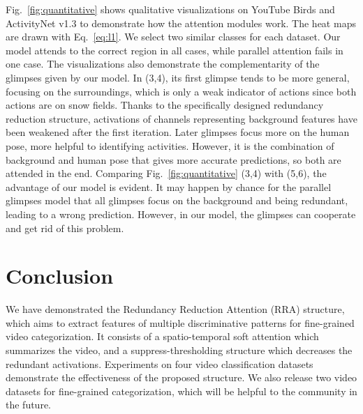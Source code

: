 \documentclass[runningheads]{llncs}
\begin{document}
Fig.~\ref{fig:quantitative} shows qualitative visualizations on YouTube Birds and ActivityNet v1.3 to demonstrate how the attention modules work. The heat maps are drawn with Eq.~\ref{eq:l1}. We select two similar classes for each dataset. Our model attends to the correct region in all cases, while parallel attention fails in one case. The visualizations also demonstrate the complementarity of the glimpses given by our model. In (3,4), its first glimpse tends to be more general, focusing on the surroundings, which is only a weak indicator of actions since both actions are on snow fields. Thanks to the specifically designed redundancy reduction structure, activations of channels representing background features have been weakened after the first iteration. Later glimpses focus more on the human pose, more helpful to identifying activities. However, it is the combination of background and human pose that gives more accurate predictions, so both are attended in the end. Comparing Fig.~\ref{fig:quantitative} (3,4) with (5,6), the advantage of our model is evident. It may happen by chance for the parallel glimpses model that all glimpses focus on the background and being redundant, leading to a wrong prediction. However, in our model, the glimpses can cooperate and get rid of this problem.

\section{Conclusion}
We have demonstrated the Redundancy Reduction Attention (RRA) structure, which aims to extract features of multiple discriminative patterns for fine-grained video categorization. It consists of a spatio-temporal soft attention which summarizes the video, and a suppress-thresholding structure which decreases the redundant activations. Experiments on four video classification datasets demonstrate the effectiveness of the proposed structure. We also release two video datasets for fine-grained categorization, which will be helpful to the community in the future. 
\clearpage


\end{document}
